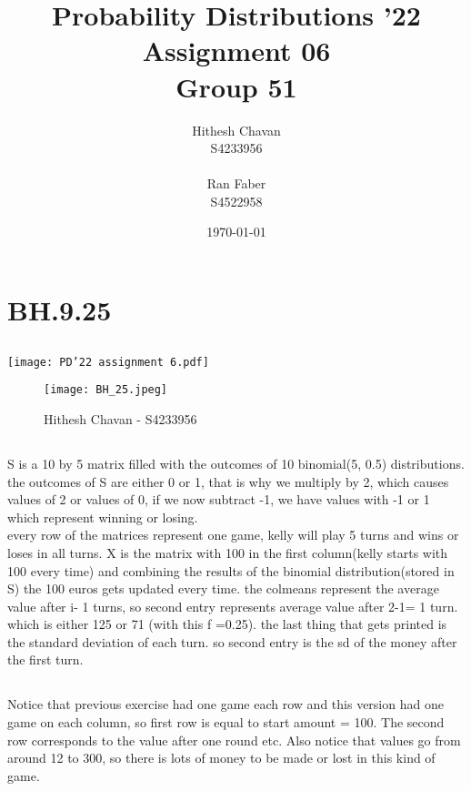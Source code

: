 \documentclass{article}
\title{Probability Distributions '22 \\ Assignment 06 \\ Group 51}
\author{Hithesh Chavan \\ S4233956 \\ \\ Ran Faber \\ S4522958 }
\date{\today}
\begin{document}
\maketitle
\setcounter{section}{6}
\section*{BH.9.25}
\subsection{}
\texttt{[image: PD'22 assignment 6.pdf]} \\ 
\begin{figure}
    \centering
    \texttt{[image: BH\_25.jpeg]}
    \caption{Hithesh Chavan - S4233956}
    \label{fig:my_label_1}
\end{figure}

\subsection{}

S is a 10 by 5 matrix filled with the outcomes of 10 binomial(5, 0.5) distributions. the outcomes of S are either 0 or 1, that is why we multiply by 2, which causes values of 2 or values of 0, if we now subtract -1, we have values with -1 or 1 which represent winning or losing.\\
every row of the matrices represent one game, kelly will play 5 turns and wins or loses in all turns. X is the matrix with 100 in the first column(kelly starts with 100 every time) and combining the results of the binomial distribution(stored in S) the 100 euros gets updated every time. the colmeans represent the average value after i- 1 turns, so second entry represents average value after 2-1= 1 turn. which is either 125 or 71 (with this f =0.25). the last thing that gets printed is the standard deviation of each turn. so second entry is the sd of the money after the first turn.

\subsection{}
Notice that previous exercise had one game each row and this version had one game on each column, so first row is equal to start amount = 100. The second row corresponds to the value after one round etc. Also notice that values go from around 12 to 300, so there is lots of money to be made or lost in this kind of game.
\end{document}
